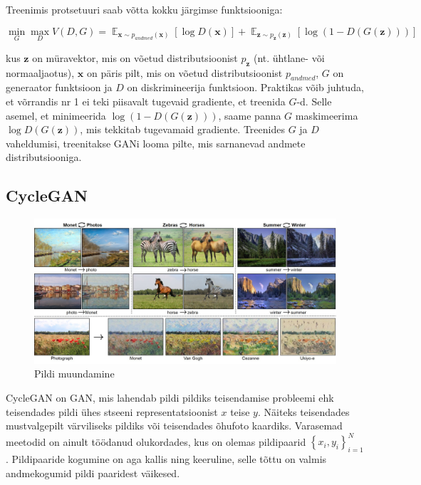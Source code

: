 \documentclass{vilgym}
\DeclareMathOperator{\EX}{\mathbb{E}}
\begin{document}
    Treenimis protsetuuri saab võtta kokku järgimse funktsiooniga:

    \begin{equation}
        \operatorname*{min}_G \operatorname*{max}_D V(D,G) = \EX_{\boldsymbol{x}\sim p_{andmed}(\boldsymbol{x})}[\log D(\boldsymbol{x})] + \EX_{\boldsymbol{z}\sim p_{\boldsymbol{z}}(\boldsymbol{z})}[\log(1-D(G(\boldsymbol{z})))]
    \end{equation}

    kus $ \boldsymbol{z} $ on müravektor, mis on võetud distributsioonist $ p_{\boldsymbol{z}} $ (nt. ühtlane- või normaaljaotus), $ \boldsymbol{x} $ on päris pilt, mis on võetud distributsioonist $ p_{andmed} $, $ G $ on generaator funktsioon ja $ D $ on diskrimineerija funktsioon. Praktikas võib juhtuda, et võrrandis nr 1 ei teki piisavalt tugevaid gradiente, et treenida $ G $-d. Selle asemel, et minimeerida $ \log (1 - D(G(\boldsymbol{z}))) $, saame panna $ G $ maskimeerima $ \log D(G(\boldsymbol{z})) $, mis tekkitab tugevamaid gradiente. Treenides $ G $ ja $ D $ vaheldumisi, treenitakse GANi looma pilte, mis sarnanevad andmete distributsiooniga. \parencite{gan}

    \subsection{CycleGAN}
    \begin{figure}
        \centering
            \includegraphics[width=\linewidth]{images/cyclegan.jpg}
            \caption{Pildi muundamine}
            \label{fig:cyclegan}
    \end{figure}
    CycleGAN on GAN, mis lahendab pildi pildiks teisendamise probleemi ehk teisendades pildi ühes stseeni representatsioonist $ x $ teise $ y $. Näiteks teisendades mustvalgepilt värviliseks pildiks või teisendades õhufoto kaardiks. Varasemad meetodid on ainult töödanud olukordades, kus on olemas pildipaarid $ \left\{x_i,y_i\right\}_{i=1}^N $. Pildipaaride kogumine on aga kallis ning keeruline, selle tõttu on valmis andmekogumid pildi paaridest väikesed.
\end{document}
